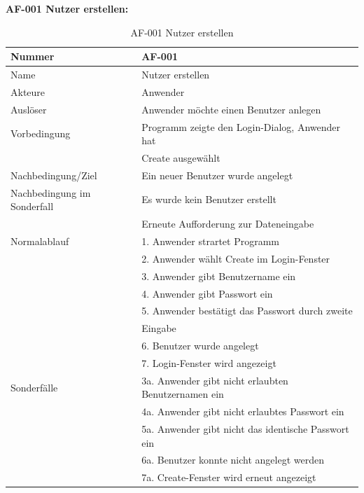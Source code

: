 \documentclass[12pt,a4paper,bibliography=totocnumbered,listof=totocnumbered]{scrartcl}
\begin{document}
\textbf{AF-001 Nutzer erstellen:}
\begin{table}[!h]
	\centering
	\begin{tabular}{|l|l|}
		\hline
		Nummer & AF-001\\
		\hline
		Name & Nutzer erstellen\\
		\hline
		Akteure & Anwender\\
		\hline
		Auslöser & Anwender möchte einen Benutzer anlegen\\
		\hline
		Vorbedingung & Programm zeigte den Login-Dialog, Anwender hat \\ &  Create ausgewählt\\
		\hline
		Nachbedingung/Ziel & Ein neuer Benutzer wurde angelegt \\
		\hline
		Nachbedingung im Sonderfall & Es wurde kein Benutzer erstellt \\ & Erneute Aufforderung zur Dateneingabe\\
		\hline
		Normalablauf & 1. Anwender strartet Programm \\ & 2. Anwender wählt Create im Login-Fenster\\ & 3. Anwender gibt Benutzername ein \\ & 4. Anwender gibt Passwort ein \\ & 5. Anwender bestätigt das Passwort durch zweite\\ &Eingabe\\& 6. Benutzer wurde angelegt\\& 7. Login-Fenster wird angezeigt \\
		\hline
		Sonderfälle & 3a. Anwender gibt nicht erlaubten Benutzernamen ein \\ & 4a. Anwender gibt nicht erlaubtes Passwort ein \\& 5a. Anwender gibt nicht das identische Passwort ein\\& 6a. Benutzer konnte nicht angelegt werden \\& 7a. Create-Fenster wird erneut angezeigt\\
		\hline
	\end{tabular}
	\caption{AF-001 Nutzer erstellen}
	\label{tab:AF-001 Nutzer erstellen}
\end{table}
\pagebreak
\end{document}
